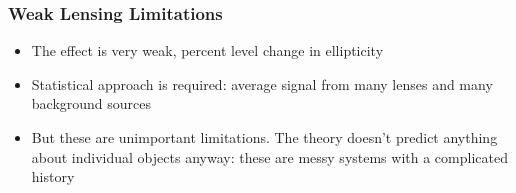 \documentclass{beamer}
\begin{document}
\frame
{
    \frametitle{Weak Lensing Limitations}

 
            \begin{itemize}

                \item The effect is very weak, percent level change in
                    ellipticity

                \item Statistical approach is required: average signal from
                    many lenses and many background sources

                \item But these are unimportant limitations. The theory doesn't
                    predict anything about individual objects anyway: these are
                    messy systems with a complicated history

            \end{itemize}


}
\end{document}
